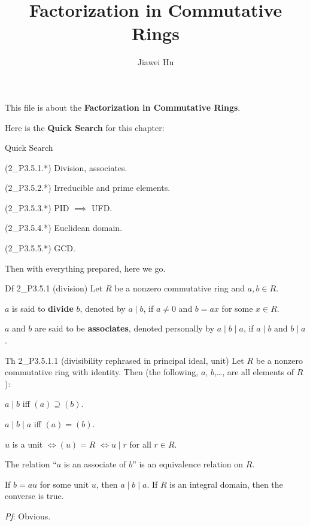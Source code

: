 \documentclass{article}
\title{\LARGE \textbf{Factorization in Commutative Rings}}
\author{\large Jiawei Hu}
\begin{document}
\maketitle

This file is about the \textbf{Factorization in Commutative Rings}.

Here is the \textbf{Quick Search} for this chapter:
\begin{Th}{Quick Search}
    \begin{compactdesc}
        \item (2\_P3.5.1.*) Division, associates.
        \item (2\_P3.5.2.*) Irreducible and prime elements.
        \item (2\_P3.5.3.*) PID $\implies$ UFD.
        \item (2\_P3.5.4.*) Euclidean domain.
        \item (2\_P3.5.5.*) GCD.
    \end{compactdesc}
\end{Th}

Then with everything prepared, here we go.

\begin{Df}{Df 2\_P3.5.1 (division)}
    Let $R$ be a nonzero commutative ring and $a, b \in R$.
    \begin{compactenum}
        \item $a$ is said to \textbf{divide} $b$, denoted by $a\mid b$, if $a\neq 0$ and $b=ax$ for some $x \in R$.
        \item $a$ and $b$ are said to be \textbf{associates}, denoted personally by $a\mid b\mid a$, if $a\mid b$ and $b\mid a$.
    \end{compactenum}
\end{Df}

\begin{Th}{Th 2\_P3.5.1.1 (divisibility rephrased in principal ideal, unit)}
    Let $R$ be a nonzero commutative ring with identity. Then (the following, $a$, $b$,\dots, are all elements of $R$):
    \begin{compactenum}
        \item $a\mid b$ iff $(a)\supseteq (b)$.
        \item $a\mid b\mid a$ iff $(a)=(b)$.
        \item $u$ is a unit \quad $\iff$\quad $(u)=R$ \quad $\iff$\quad $u\mid r$ for all $r\in R$.
        \item The relation ``$a$ is an associate of $b$'' is an equivalence relation on $R$.
        \item If $b=au$ for some unit $u$, then $a\mid b\mid a$. If $R$ is an integral domain, then the converse is true.
    \end{compactenum}
    \tcblower
    \textit{Pf}: Obvious.
\end{Th}
\end{document}
